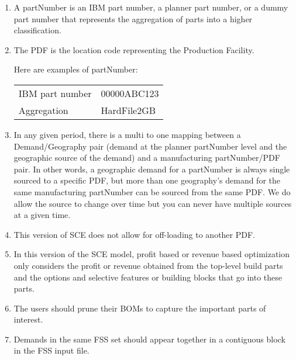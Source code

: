 \begin{enumerate}

\item A partNumber is an IBM part number, a planner part number, or a dummy part number that
represents the aggregation of parts into a higher classification.
\item The PDF is the location code representing the Production Facility.
   
Here are examples of partNumber:
\begin{center}
\begin{tabular}{ll}
  IBM part number  &   00000ABC123 \\
  Aggregation  &      HardFile2GB 
\end{tabular}
\end{center}

\item In any given period, there is a multi to one mapping between a
Demand/Geography pair (demand at the planner partNumber level and the
geographic source of the demand) and a manufacturing partNumber/PDF
pair.  In other words, a geographic demand for a partNumber is always
single sourced to a specific PDF, but more than one geography's demand
for the same manufacturing partNumber can be sourced from the same PDF.
We do allow the source to change
over time but you can never have multiple sources at a given time.

\item This version of SCE does not allow for off-loading to another PDF.
 
 
\item In this version of the SCE model, profit based or revenue based 
   optimization only considers the profit or revenue obtained from the
   top-level build parts and the options and selective features or building blocks
   that go into these parts.

\item The users should prune their BOMs to capture the important parts of
   interest.  

\item Demands in the same FSS set should appear together in a contiguous
   block in the FSS input file.
 
\end{enumerate}

